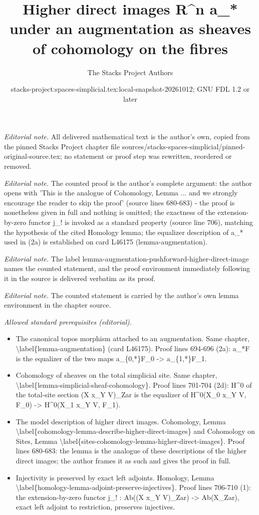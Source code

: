 \documentclass{stacks-project}
\title{Higher direct images R\textasciicircum{}n a\_* under an augmentation as sheaves of cohomology on the fibres}
\author{The Stacks Project Authors}
\date{stacks-project:spaces-simplicial.tex:local-snapshot-20261012; GNU FDL 1.2 or later}
\theoremstyle{plain}
\theoremstyle{definition}
\theoremstyle{remark}
\numberwithin{equation}{subsection}
\begin{document}
\maketitle
\noindent\textit{Editorial note.} All delivered mathematical text is the author's own, copied from the pinned Stacks Project chapter file sources/stacks-spaces-simplicial/pinned-original-source.tex; no statement or proof step was rewritten, reordered or removed.\par\medskip
\noindent\textit{Editorial note.} The counted proof is the author's complete argument: the author opens with 'This is the analogue of Cohomology, Lemma ... and we strongly encourage the reader to skip the proof' (source lines 680-683) - the proof is nonetheless given in full and nothing is omitted; the exactness of the extension-by-zero functor j\_! is invoked as a standard property (source line 706), matching the hypothesis of the cited Homology lemma; the equalizer description of a\_* used in (2a) is established on card L46175 (lemma-augmentation).\par\medskip
\noindent\textit{Editorial note.} The label lemma-augmentation-pushforward-higher-direct-image names the counted statement, and the proof environment immediately following it in the source is delivered verbatim as its proof.\par\medskip
\noindent\textit{Editorial note.} The counted statement is carried by the author's own lemma environment in the chapter source.\par\medskip
\noindent\textit{Allowed standard prerequisites (editorial).}\begin{itemize}
\item The canonical topos morphism attached to an augmentation. Same chapter, \textbackslash{}label\{lemma-augmentation\} (card L46175). Proof lines 694-696 (2a): a\_*F is the equalizer of the two maps a\_\{0,*\}F\_0 -> a\_\{1,*\}F\_1.
\item Cohomology of sheaves on the total simplicial site. Same chapter, \textbackslash{}label\{lemma-simplicial-sheaf-cohomology\}. Proof lines 701-704 (2d): H\textasciicircum{}0 of the total-site section (X x\_Y V)\_Zar is the equalizer of H\textasciicircum{}0(X\_0 x\_Y V, F\_0) -> H\textasciicircum{}0(X\_1 x\_Y V, F\_1).
\item The model description of higher direct images. Cohomology, Lemma \textbackslash{}label\{cohomology-lemma-describe-higher-direct-images\} and Cohomology on Sites, Lemma \textbackslash{}label\{sites-cohomology-lemma-higher-direct-images\}. Proof lines 680-683: the lemma is the analogue of these descriptions of the higher direct images; the author frames it as such and gives the proof in full.
\item Injectivity is preserved by exact left adjoints. Homology, Lemma \textbackslash{}label\{homology-lemma-adjoint-preserve-injectives\}. Proof lines 706-710 (1): the extension-by-zero functor j\_! : Ab((X x\_Y V)\_Zar) -> Ab(X\_Zar), exact left adjoint to restriction, preserves injectives.
\end{itemize}\medskip
\end{document}
